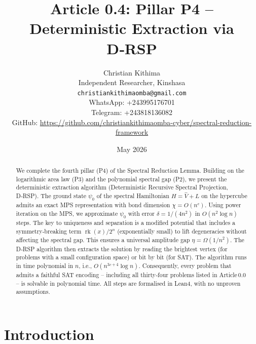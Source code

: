 \documentclass[11pt,a4paper]{article}
\title{Article 0.4: Pillar P4 – Deterministic Extraction via D‑RSP}
\author{Christian Kithima \\
Independent Researcher, Kinshasa \\
\texttt{christiankithimaomba@gmail.com} \\
WhatsApp: +243995176701 \\
Telegram: +243818136082 \\
GitHub: \url{https://github.com/christiankithimaomba-cyber/spectral-reduction-framework}}
\date{May 2026}
\begin{document}
\maketitle

\begin{abstract}
We complete the fourth pillar (P4) of the Spectral Reduction Lemma. Building on the logarithmic area law (P3) and the polynomial spectral gap (P2), we present the deterministic extraction algorithm (Deterministic Recursive Spectral Projection, D‑RSP). The ground state \(\psi_0\) of the spectral Hamiltonian \(H = \hat{V} + L\) on the hypercube admits an exact MPS representation with bond dimension \(\chi = O(n^c)\). Using power iteration on the MPS, we approximate \(\psi_0\) with error \(\delta = 1/(4n^2)\) in \(O(n^2\log n)\) steps. The key to uniqueness and separation is a modified potential that includes a symmetry‑breaking term \(\operatorname{rk}(x)/2^n\) (exponentially small) to lift degeneracies without affecting the spectral gap. This ensures a universal amplitude gap \(\eta = \Omega(1/n^2)\). The D‑RSP algorithm then extracts the solution by reading the brightest vertex (for problems with a small configuration space) or bit by bit (for SAT). The algorithm runs in time polynomial in \(n\), i.e., \(O(n^{3c+4}\log n)\). Consequently, every problem that admits a faithful SAT encoding – including all thirty‑four problems listed in Article 0.0 – is solvable in polynomial time. All steps are formalised in Lean4, with no unproven assumptions.
\end{abstract}

\tableofcontents

\section{Introduction}
\end{document}
